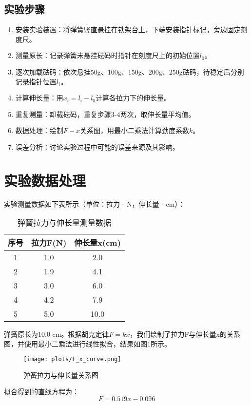 \documentclass[a4paper,12pt]{article}
\begin{document}
\subsection{实验步骤}
\begin{enumerate}
    \item 安装实验装置：将弹簧竖直悬挂在铁架台上，下端安装指针标记，旁边固定刻度尺。
    \item 测量原长：记录弹簧未悬挂砝码时指针在刻度尺上的初始位置$l_0$。
    \item 逐次加载砝码：依次悬挂50g、100g、150g、200g、250g砝码，待稳定后分别记录指针位置$l_i$。
    \item 计算伸长量：用$x_i = l_i - l_0$计算各拉力下的伸长量。
    \item 重复测量：卸载砝码，重复步骤3-4两次，取伸长量平均值。
    \item 数据处理：绘制$F-x$关系图，用最小二乘法计算劲度系数$k$。
    \item 误差分析：讨论实验过程中可能的误差来源及其影响。
\end{enumerate}

\section{实验数据处理}
实验测量数据如下表所示（单位：拉力 - N，伸长量 - cm）：

\begin{table}[h]
\centering
\caption{弹簧拉力与伸长量测量数据}
\begin{tabular}{|c|c|c|}
\hline
序号 & 拉力F(N) & 伸长量x(cm) \\ \hline
1 & 1.0 & 2.0 \\ \hline
2 & 1.9 & 4.1 \\ \hline
3 & 3.0 & 6.0 \\ \hline
4 & 4.2 & 7.9 \\ \hline
5 & 5.0 & 10.0 \\ \hline
\end{tabular}
\end{table}

弹簧原长为10.0 cm。根据胡克定律$F = kx$，我们绘制了拉力F与伸长量x的关系图，并使用最小二乘法进行线性拟合，结果如图1所示。

\begin{figure}[h]
\centering
\texttt{[image: plots/F\_x\_curve.png]}
\caption{弹簧拉力与伸长量关系图}
\label{fig:F-x}
\end{figure}

拟合得到的直线方程为：
$$ F = 0.519x - 0.096 $$
\end{document}
